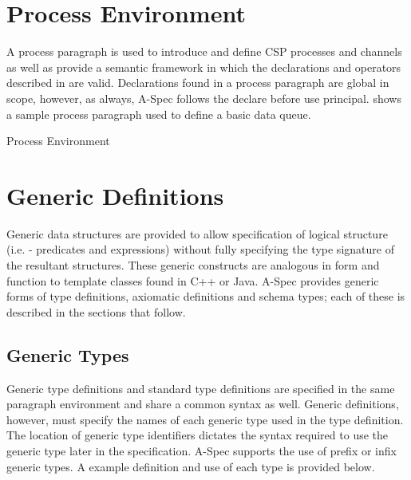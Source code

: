 \documentclass[letterpaper,10pt,draft]{book}
\begin{document}
\section{Process Environment}
   \label{sect:Process}

A process paragraph is used to introduce and define CSP processes and channels
as well as provide a semantic framework in which the declarations and operators
described in  are valid.  Declarations found in a process paragraph
are global in scope, however, as always, A-Spec follows the declare before use principal.
 shows a sample process paragraph used to define a basic data
queue.

\begin{example}
\begin{minipage}[t]{0.49\linewidth}
   
\end{minipage}
\begin{minipage}[t]{0.49\linewidth}
   \azbox
   
\end{minipage}

   \caption{Process Environment}
   \label{ex:ProcEnv}
\end{example}

\section{Generic Definitions}
   \label{sect:Generics}

Generic data structures are provided to allow specification of logical structure
(i.e. - predicates and expressions) without fully specifying the type signature of
the resultant structures.  These generic constructs are analogous in form and function
to template classes found in C++ or Java.  A-Spec provides generic forms of type
definitions, axiomatic definitions and schema types; each of these is described
in the sections that follow.

\subsection{Generic Types}
   \label{sect:GenType}

Generic type definitions and standard type definitions are specified in the same
paragraph environment and share a common syntax as well.  Generic definitions, however,
must specify the names of each generic type used in the type definition.  The location
of generic type identifiers dictates the syntax required to use the generic type
later in the specification.  A-Spec supports the use of prefix or infix generic
types.  A example definition and use of each type is provided below.
\end{document}
